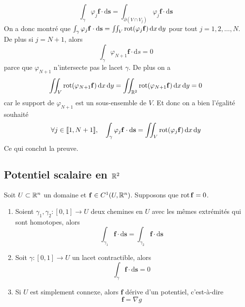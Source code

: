 {	\[
	\int_\gamma \varphi_j \bm f \cdot \mathrm d \bm s = \int_{\partial(V \cap V_j)}  \varphi_j \bm f \cdot \mathrm d \bm s
		\]
		On a donc montré que $\int_\gamma \varphi_j \mathbf{f} \cdot \mathrm d \mathbf{s} = \iint_V \operatorname{rot}(\varphi_j \mathbf{f}) \, \mathrm dx \, \mathrm dy$ pour tout $j = 1, 2, \ldots, N$. De plus si $j = N+1$, alors
		\[
		\int_{\gamma} \varphi_{N+1} \bm f \cdot \mathrm ds = 0
		\]
		parce que $\varphi_{N+1}$ n'intersecte pas le lacet $\gamma$. De plus on a
		\[
		\iint_V \operatorname{rot}(\varphi_{N+1} \mathbf{f}) \, \mathrm dx \, \mathrm dy = \iint_{\mathbb{R}^2} \operatorname{rot}(\varphi_{N+1} \mathbf{f}) \, \mathrm dx \, \mathrm dy = 0
		\]
		car le support de $\varphi_{N+1}$ est un sous-ensemble de $V$. Et donc on a bien l'égalité souhaité
		\[
		\forall j \in \llbracket 1, N+1 \rrbracket, \quad \int_\gamma \varphi_j \mathbf{f} \cdot \mathrm d \mathbf{s} = \iint_V \operatorname{rot}(\varphi_j \mathbf{f}) \, \mathrm dx \, \mathrm dy
		\]
		Ce qui conclut la preuve.	
}

\subsection{Potentiel scalaire en $\mathbb{R}^2$}
\begin{proposition}\label{prop: Condition suffisante de dérive d'un potentiel scalaire}
	Soit $U \subset \mathbb{R}^n$ un domaine et $\mathbf{f} \in C^1(U, \mathbb{R}^n)$. Supposons que $\operatorname{rot} \mathbf{f} = 0$.
	\begin{enumerate}
		\item Soient $\gamma_1, \gamma_2 : [0,1] \to U$ deux chemines en $U$ avec les mêmes extrémités qui sont homotopes, alors
		\[
		\int_{\gamma_1} \bm f \cdot \mathrm d \bm s = \int_{\gamma_2} \bm f \cdot \mathrm d \bm s
		\]
		\item Soit $\gamma : [0,1] \to U$ un lacet contractible, alors
		\[
		\int_\gamma \bm f \cdot \mathrm d \bm s = 0
		\]
		\item Si $U$ est simplement connexe, alors $\bm f$ dérive d'un potentiel, c'est-à-dire
		\[
		\bm f = \nabla g
		\]
	\end{enumerate}
\end{proposition}


